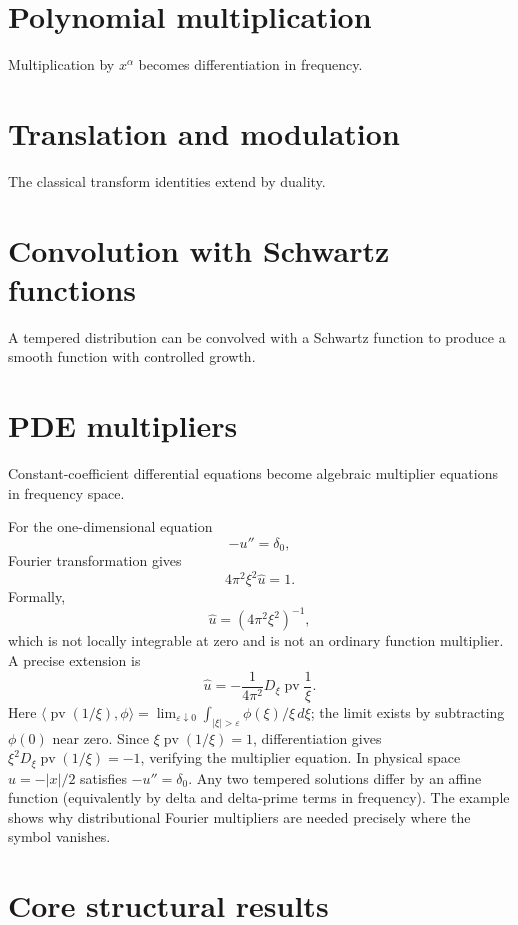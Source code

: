\section{Polynomial multiplication}
Multiplication by $x^\alpha$ becomes differentiation in frequency.

\section{Translation and modulation}
The classical transform identities extend by duality.

\section{Convolution with Schwartz functions}
A tempered distribution can be convolved with a Schwartz function to produce a smooth function with controlled growth.

\section{PDE multipliers}
Constant-coefficient differential equations become algebraic multiplier equations in frequency space.


\begin{example}\label{ex:iii19-expand-03}
For the one-dimensional equation
\[
-u''=\delta_0,
\]
Fourier transformation gives
\[
4\pi^2\xi^2\widehat u=1.
\]
Formally,
\[
\widehat u=(4\pi^2\xi^2)^{-1},
\]
which is not locally integrable at zero and is not an ordinary function multiplier. A precise extension is
\[
\widehat u=-\frac1{4\pi^2}D_\xi\operatorname{pv}\frac1\xi.
\]
Here $\langle\operatorname{pv}(1/\xi),\phi\rangle=\lim_{\varepsilon\downarrow0}\int_{|\xi|>\varepsilon}\phi(\xi)/\xi\,d\xi$; the limit exists by subtracting $\phi(0)$ near zero. Since $\xi\operatorname{pv}(1/\xi)=1$, differentiation gives $\xi^2D_\xi\operatorname{pv}(1/\xi)=-1$, verifying the multiplier equation. In physical space $u=-|x|/2$ satisfies $-u''=\delta_0$. Any two tempered solutions differ by an affine function (equivalently by delta and delta-prime terms in frequency). The example shows why
distributional Fourier multipliers are needed precisely where the symbol
vanishes.
\end{example}
\section{Core structural results}

